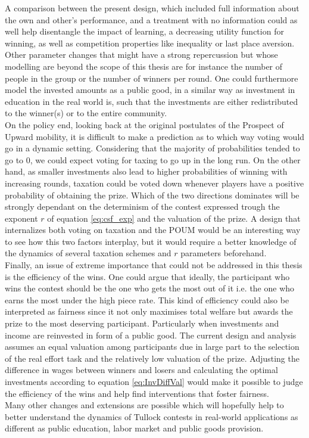 A comparison between the present design, which included full information about the own and other's performance, and a treatment with no information could as well help disentangle the impact of learning, a decreasing utility function for winning, as well as competition properties like inequality or last place aversion.\\

Other parameter changes that might have a strong repercussion but whose modelling are beyond the scope of this thesis are for instance the number of people in the group or the number of winners per round. One could furthermore model the invested amounts as a public good, in a similar way as investment in education in the real world is, such that the investments are either redistributed to the winner(s) or to the entire community.\\

On the policy end, looking back at the original postulates of the Prospect of Upward mobility, it is difficult to make a prediction as to which way voting would go in a dynamic setting. Considering that the majority of probabilities tended to go to 0, we could expect voting for taxing to go up in the long run. On the other hand, as smaller investments also lead to higher probabilities of winning with increasing rounds, taxation could be voted down whenever players have a positive probability of obtaining the prize. Which of the two directions dominates will be strongly dependant on the determinism of the contest expressed trough the exponent $r$ of equation \ref{eq:csf_exp} and the valuation of the prize. A design that internalizes both voting on taxation and the POUM would be an interesting way to see how this two factors interplay, but it would require a better knowledge of the dynamics of several taxation schemes and $r$ parameters beforehand.\\

Finally, an issue of extreme importance that could not be addressed in this thesis is the efficiency of the wins. One could argue that ideally, the participant who wins the contest should be the one who gets the most out of it i.e. the one who earns the most under the high piece rate. This kind of efficiency could also be interpreted as fairness since it not only maximises total welfare but awards the prize to the most deserving participant. Particularly when investments and income are reinvested in form of a public good. The current design and analysis assumes an equal valuation among participants due in large part to the selection of the real effort task and the relatively low valuation of the prize. Adjusting the difference in wages between winners and losers and calculating the optimal investments according to equation \ref{eq:InvDiffVal} would make it possible to judge the efficiency of the wins and help find interventions that foster fairness.\\

Many other changes and extensions are possible which will hopefully help to better understand the dynamics of Tullock contests in real-world applications as different as public education, labor market and public goods provision.\\
